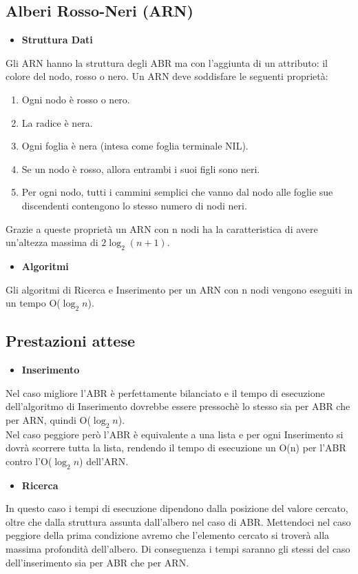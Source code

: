\documentclass{article}
\begin{document}
\subsection{Alberi Rosso-Neri (ARN)}
\begin{itemize}
    \item \textbf{Struttura Dati}
\end{itemize}
Gli ARN hanno la struttura degli ABR ma con l'aggiunta di un attributo: il colore del nodo, rosso o nero. Un ARN deve soddisfare le seguenti proprietà:
\begin{enumerate}
    \item Ogni nodo è rosso o nero.
    \item La radice è nera.
    \item Ogni foglia è nera (intesa come foglia terminale NIL).
    \item Se un nodo è rosso, allora entrambi i suoi figli sono neri.
    \item Per ogni nodo, tutti i cammini semplici che vanno dal nodo alle foglie sue discendenti contengono lo stesso numero di nodi neri.
\end{enumerate}
Grazie a queste proprietà un ARN con n nodi ha la caratteristica di avere un'altezza massima di $2{\log_{2}{(n+1)}}$.
\begin{itemize}
    \item \textbf{Algoritmi}
\end{itemize}
Gli algoritmi di Ricerca e Inserimento per un ARN con n nodi vengono eseguiti in un tempo O(${\log_{2}{n}}$).

\subsection{Prestazioni attese}
\begin{itemize}
    \item \textbf{Inserimento}
\end{itemize}
Nel caso migliore l'ABR è perfettamente bilanciato e il tempo di esecuzione dell'algoritmo di Inserimento dovrebbe essere pressochè lo stesso sia per ABR che per ARN, quindi O(${\log_{2}{n}}$). \\
Nel caso peggiore però l'ABR è equivalente a una lista e per ogni Inserimento si dovrà scorrere tutta la lista, rendendo il tempo di esecuzione un O(n) per l'ABR contro l'O(${\log_{2}{n}}$)  dell'ARN.

\begin{itemize}
    \item \textbf{Ricerca}
\end{itemize}
In questo caso i tempi di esecuzione dipendono dalla posizione del valore cercato, oltre che dalla struttura assunta dall'albero nel caso di ABR. Mettendoci nel caso peggiore della prima condizione avremo che l'elemento cercato si troverà alla massima profondità dell'albero. Di conseguenza i tempi saranno gli stessi del caso dell'inserimento sia per ABR che per ARN.
\end{document}
